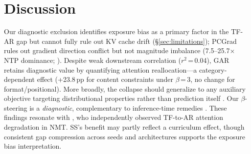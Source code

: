 \section{Discussion}\label{sec:discussion}

 Our diagnostic exclusion identifies exposure bias as a primary factor in the TF-AR gap but cannot fully rule out KV cache drift (\S\ref{sec:limitations}); PCGrad rules out gradient direction conflict but not magnitude imbalance (7.5--25.7$\times$ NTP dominance; \citealp{chen2018gradnorm}). Despite weak downstream correlation ($r^2$\,=\,0.04), GAR retains diagnostic value by quantifying attention reallocation---a category-dependent effect (+23.8\,pp for content constraints under $\beta$\,=\,3, no change for format/positional). More broadly, the collapse should generalize to any auxiliary objective targeting distributional properties rather than prediction itself \citep{he2019exposure}. Our $\beta$-steering is a \emph{diagnostic}, complementary to inference-time remedies \citep{li2024measuring,hong2025rhea}. These findings resonate with \citet{dou2019attention,dou2022parallel}, who independently observed TF-to-AR attention degradation in NMT. SS's benefit may partly reflect a curriculum effect, though consistent gap compression across seeds and architectures supports the exposure bias interpretation.
